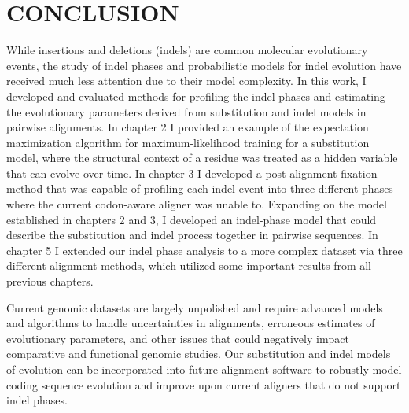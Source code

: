 \chapter{\normalfont CONCLUSION}
While insertions and deletions (indels) are common molecular evolutionary events, the study of indel phases and probabilistic models for indel evolution have received much less attention due to their model complexity. In this work, I developed and evaluated methods for profiling the indel phases and estimating the evolutionary parameters derived from substitution and indel models in pairwise alignments. In chapter 2 I provided an example of the expectation maximization algorithm for maximum-likelihood training for a substitution model, where the structural context of a residue was treated as a hidden variable that can evolve over time. In chapter 3 I developed a post-alignment fixation method that was capable of profiling each indel event into three different phases where the current codon-aware aligner was unable to. Expanding on the model established in chapters 2 and 3, I developed an indel-phase model that could describe the substitution and indel process together in pairwise sequences. In chapter 5 I extended our indel phase analysis to a more complex dataset via three different alignment methods, which utilized some important results from all previous chapters. 

Current genomic datasets are largely unpolished and require advanced models and algorithms to handle uncertainties in alignments, erroneous estimates of evolutionary parameters, and other issues that could negatively impact comparative and functional genomic studies. Our substitution and indel models of evolution can be incorporated into future alignment software to robustly model coding sequence evolution and improve upon current aligners that do not support indel phases. 
 
